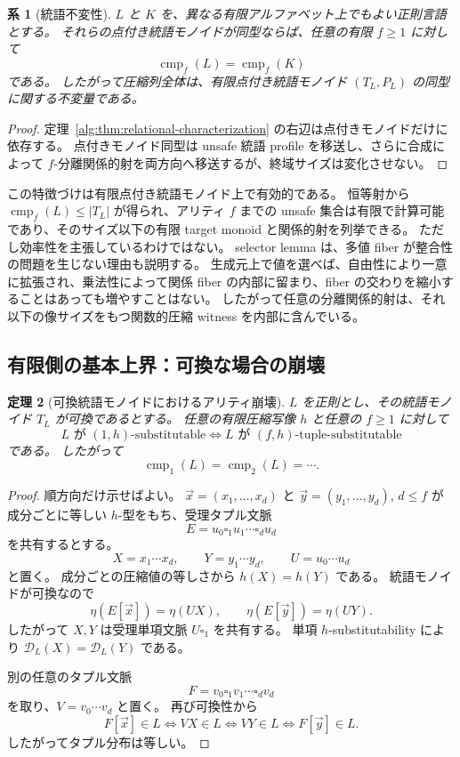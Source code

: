\documentclass[10pt,a4paper]{ltjsarticle}
\newtheorem{theorem}{定理}[section]
\newtheorem{corollary}[theorem]{系}
\theoremstyle{definition}
\theoremstyle{remark}
\newcommand{\cmp}{\operatorname{cmp}}
\newcommand{\D}{\mathcal D}
\newcommand{\blank}{\square}
\begin{document}
\begin{corollary}[統語不変性]
\label{alg:cor:syntactic-invariance}
$L$ と $K$ を、異なる有限アルファベット上でもよい正則言語とする。
それらの点付き統語モノイドが同型ならば、任意の有限 $f\ge1$ に対して
\[
\cmp_f(L)=\cmp_f(K)
\]
である。
したがって圧縮列全体は、有限点付き統語モノイド $(T_L,P_L)$ の同型に関する不変量である。
\end{corollary}

\begin{proof}
定理~\ref{alg:thm:relational-characterization} の右辺は点付きモノイドだけに依存する。
点付きモノイド同型は unsafe 統語 profile を移送し、さらに合成によって $f$-分離関係的射を両方向へ移送するが、終域サイズは変化させない。
\end{proof}

この特徴づけは有限点付き統語モノイド上で有効的である。
恒等射から $\cmp_f(L)\le|T_L|$ が得られ、アリティ $f$ までの unsafe 集合は有限で計算可能であり、そのサイズ以下の有限 target monoid と関係的射を列挙できる。
ただし効率性を主張しているわけではない。
selector lemma は、多値 fiber が整合性の問題を生じない理由も説明する。
生成元上で値を選べば、自由性により一意に拡張され、乗法性によって関係 fiber の内部に留まり、fiber の交わりを縮小することはあっても増やすことはない。
したがって任意の分離関係的射は、それ以下の像サイズをもつ関数的圧縮 witness を内部に含んでいる。

\subsection{有限側の基本上界：可換な場合の崩壊}

\begin{theorem}[可換統語モノイドにおけるアリティ崩壊]
\label{group:thm:commutative-collapse}
$L$ を正則とし、その統語モノイド $T_L$ が可換であるとする。
任意の有限圧縮写像 $h$ と任意の $f\ge1$ に対して
\[
L\text{ が }(1,h)\text{-substitutable}
\iff
L\text{ が }(f,h)\text{-tuple-substitutable}
\]
である。
したがって
\[
\cmp_1(L)=\cmp_2(L)=\cdots.
\]
\end{theorem}

\begin{proof}
順方向だけ示せばよい。
$\vec x=(x_1,\ldots,x_d)$ と $\vec y=(y_1,\ldots,y_d)$, $d\le f$ が成分ごとに等しい $h$-型をもち、受理タプル文脈
\[
E=u_0\blank_1u_1\cdots\blank_du_d
\]
を共有するとする。
\[
X=x_1\cdots x_d,
\qquad
Y=y_1\cdots y_d,
\qquad
U=u_0\cdots u_d
\]
と置く。
成分ごとの圧縮値の等しさから $h(X)=h(Y)$ である。
統語モノイドが可換なので
\[
\eta(E[\vec x])=\eta(UX),
\qquad
\eta(E[\vec y])=\eta(UY).
\]
したがって $X,Y$ は受理単項文脈 $U\blank_1$ を共有する。
単項 $h$-substitutability により
$\D_L(X)=\D_L(Y)$
である。

別の任意のタプル文脈
\[
F=v_0\blank_1v_1\cdots\blank_dv_d
\]
を取り、$V=v_0\cdots v_d$ と置く。
再び可換性から
\[
F[\vec x]\in L
\iff VX\in L
\iff VY\in L
\iff F[\vec y]\in L.
\]
したがってタプル分布は等しい。
\end{proof}
\end{document}
